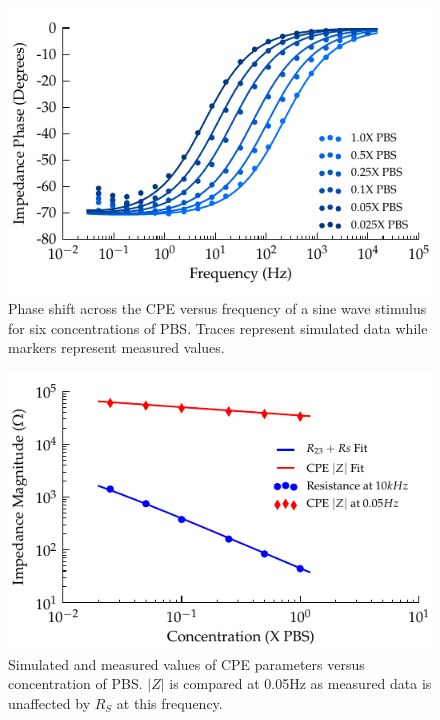 \documentclass[journal, a4paper]{IEEEtran}
\begin{document}
\begin{figure}
    \begin{center}
        \includegraphics{graphics/displacement_impedanceVsFrequency_phase}
    \end{center}
    \caption{Phase shift across the CPE versus frequency of a sine wave stimulus for six concentrations of PBS. Traces represent simulated data while markers represent measured values.}
    \label{fig:CPE_Phase}
\end{figure}

\begin{figure}
    \begin{center}
        \includegraphics{graphics/scalingFactors_Displacement_IEEE}
    \end{center}
    \caption{Simulated and measured values of CPE parameters versus concentration of PBS. $|Z|$ is compared at 0.05\thinspace Hz as measured data is unaffected by $R_{S}$ at this frequency.}
    \label{fig:CPE_Scaling}
\end{figure}
\end{document}

